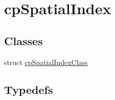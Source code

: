 \hypertarget{group__cp_spatial_index}{}\section{cp\+Spatial\+Index}
\label{group__cp_spatial_index}
\subsection*{Classes}
\begin{DoxyCompactItemize}
\item 
struct \mbox{\hyperlink{structcp_spatial_index_class}{cp\+Spatial\+Index\+Class}}
\end{DoxyCompactItemize}
\subsection*{Typedefs}
